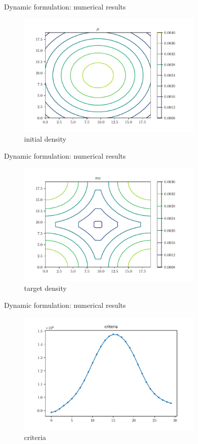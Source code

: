 \documentclass{beamer}
\begin{document}
\begin{frame}{Dynamic formulation: numerical results}
\begin{figure}
    \centering
    \includegraphics[width=0.8\textwidth]{graphics/mu.pdf}
    \caption{initial density}
    \label{fig:mu}
\end{figure}
\end{frame}
\begin{frame}{Dynamic formulation: numerical results}
\begin{figure}
    \centering
    \includegraphics[width=0.8\textwidth]{graphics/nu.pdf}
    \caption{target density}
    \label{fig:nu}
\end{figure}
\end{frame}
\begin{frame}{Dynamic formulation: numerical results}
\begin{figure}
    \centering
    \includegraphics[width=0.8\textwidth]{graphics/criteria.pdf}
    \caption{criteria}
    \label{fig:nu}
\end{figure}
\end{frame}
\end{document}
